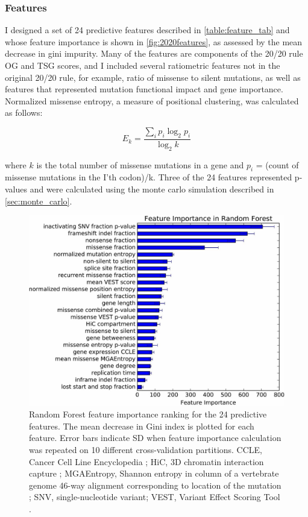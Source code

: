 \subsubsection{Features}

I designed a set of 24 predictive features described in \autoref{table:feature_tab} and whose feature importance is shown in \autoref{fig:2020features}, as assessed by the mean decrease in gini impurity. Many of the features are components of the 20/20 rule OG and TSG scores, and I included several ratiometric features not in the original 20/20 rule, for example, ratio of missense to silent mutations, as well as features that represented mutation functional impact and gene importance. Normalized missense entropy, a measure of positional clustering, was calculated as follows:

\begin{equation}
E_k = \frac{\sum_i{p_i\log_2{p_i}}}{\log_2{k}}
\end{equation}

where $k$ is the total number of missense mutations in a gene and $p_i$ = (count of missense mutations in the I'th codon)/k. Three of the 24 features represented p-values and were calculated using the monte carlo simulation described in \autoref{sec:monte_carlo}.

\begin{figure}
  \centering
  \makeatletter
  \let\@currsize\normalsize
  \includegraphics[width=0.9\linewidth]{figures/chapter3/feature_importance.jpg}
  \caption[Random Forest feature importance ranking for the 24 predictive features.]{Random Forest feature importance ranking for the 24 predictive features. The mean decrease in Gini index is plotted for each feature. Error bars indicate SD when feature importance calculation was repeated on 10 different cross-validation partitions. CCLE, Cancer Cell Line Encyclopedia \cite{RN13}; HiC, 3D chromatin interaction capture \cite{RN13}; MGAEntropy, Shannon entropy in column of a vertebrate genome 46-way alignment corresponding to location of the mutation \cite{RN90}; SNV, single-nucleotide variant; VEST, Variant Effect Scoring Tool \cite{RN30}.}
  \label{fig:2020features}
\end{figure}

